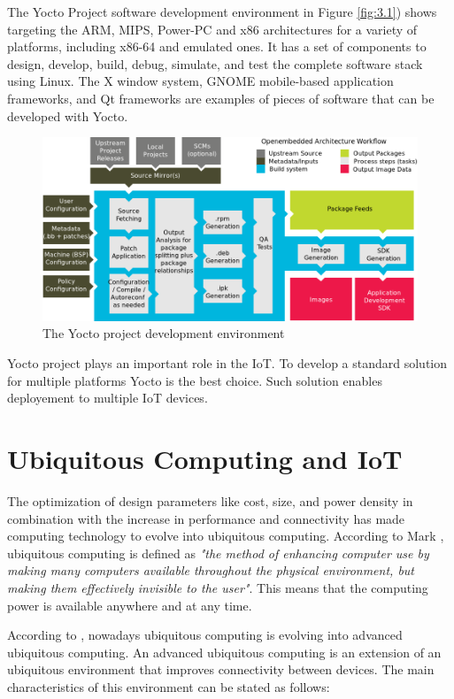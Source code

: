 The Yocto Project software development environment in Figure \ref{fig:3.1})
shows targeting the ARM, MIPS, Power-PC and x86 architectures for a variety of
platforms, including x86-64 and emulated ones. It has a set of components to design,
develop, build, debug, simulate, and test the complete software stack using
Linux. The X window system, GNOME mobile-based application frameworks, and Qt
frameworks are examples of pieces of software that can be developed with Yocto.

\begin{figure}[H]
\centering
\includegraphics[width=1\textwidth]{images/yocto-environment.png}
\caption{The Yocto project development environment}
\label{fig:3.2}
\end{figure}

Yocto project plays an important role in the IoT. To develop a standard
solution for multiple platforms Yocto is the best choice. Such solution enables
deployement to multiple IoT devices. 


\section{Ubiquitous Computing and IoT}
\noindent

The optimization of design parameters like cost, size, and power density
in combination with the increase in performance and connectivity
has made computing technology to evolve into ubiquitous computing.
According to Mark \cite{Mark}, ubiquitous computing is defined as \textit{"the method of
enhancing computer use by making many computers available throughout the
physical environment, but making them effectively invisible to the user"}. This
means that the computing power is available anywhere and at any time.

According to \cite{Nur}, nowadays ubiquitous computing is evolving into
advanced ubiquitous computing. An advanced ubiquitous computing is an extension
of an ubiquitous environment that improves connectivity between devices. The
main characteristics of this environment can be stated as follows: 


